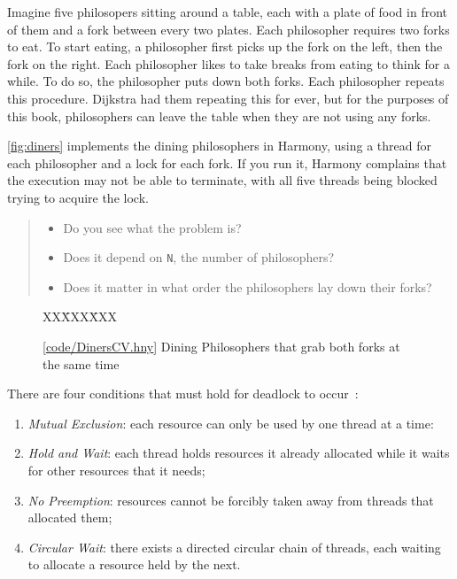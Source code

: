 \documentclass{report}
\newcommand{\harmonysource}[1]{
\begin{tabbing}
XX\=XXX\=XXX\kill
    
\end{tabbing}
}
\newcommand{\harmonylink}[1]{%
[\href{https://harmony.cs.cornell.edu/#1}{\underline{#1}}]%
}
\newenvironment{code}{
\tcolorbox
}{
\endtcolorbox
}
\begin{document}
Imagine five philosopers sitting around a table, each with a plate of food in
front of them and a fork between every two plates.  Each philosopher requires
two forks to eat.  To start eating, a philosopher first picks up the fork on
the left, then the fork on the right.  Each philosopher likes to take breaks
from eating to think for a while.  To do so, the philosopher puts down both
forks.  Each philosopher repeats this procedure.  Dijkstra had them repeating
this for ever, but for the purposes of this book, philosophers can leave
the table when they are not using any forks.

\autoref{fig:diners} implements the dining philosophers in Harmony, using a
thread for each philosopher and a lock for each fork.  If you
run it, Harmony complains that the execution may not be able to terminate,
with all five threads being blocked trying to acquire the lock.

\begin{quote}
\begin{itemize}
\item Do you see what the problem is?
\item Does it depend on \texttt{N}, the number of philosophers?
\item Does it matter in what order the philosophers lay down their forks?
\end{itemize}
\end{quote}


\begin{figure}
\begin{code}
\harmonysource{DinersCV}
\end{code}
\caption{\harmonylink{code/DinersCV.hny} Dining Philosophers that grab both forks at the same time}
\label{fig:dinerscv}
\end{figure}

\noindent
There are four conditions that must hold for deadlock to occur~\cite{CES71}:
\begin{enumerate}
\item \emph{Mutual Exclusion}: each resource can only be used by one thread at a time:
\item \emph{Hold and Wait}: each thread holds resources it already allocated while it
waits for other resources that it needs;
\item \emph{No Preemption}: resources cannot be forcibly taken away from threads that
allocated them;
\item \emph{Circular Wait}: there exists a directed circular chain of threads, each waiting
to allocate a resource held by the next.
\end{enumerate}
\end{document}
